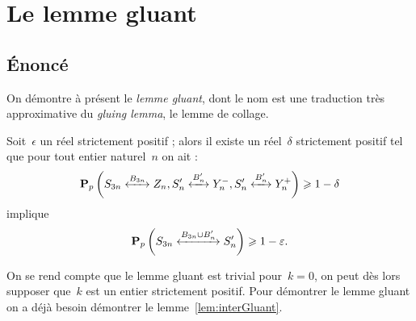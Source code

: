 \section{Le lemme gluant}
	\subsection{Énoncé}
		On démontre à présent le \emph{lemme gluant}, dont le nom est une traduction très approximative du \emph{gluing lemma}, le lemme de collage.
			
		\begin{lem}\label{lem:gluant}
			Soit~$\epsilon$ un réel strictement positif ; alors il existe un réel~$\delta$ strictement positif tel que pour tout entier naturel~$n$ on ait :
			\[
				\Pp{\relie[B_{3n}]{S_{3n}}{Z_n},
					\relie[B_n']{S_n'}{Y_n^-},
					\relie[B_n']{S_n'}{Y_n^+}}
				\geq 1 - \delta
			\]
			implique
			\[
				\Pp{\relie[B_{3n}\cup B_n']{S_{3n}}{S_n'}}
				\geq 1 - \epsilon.
			\]
		\end{lem}
		On se rend compte que le lemme gluant est trivial pour~$k=0$, on peut dès lors supposer que~$k$ est un entier strictement positif. Pour démontrer le lemme gluant on a déjà besoin démontrer le lemme~\ref{lem:interGluant}.
	
